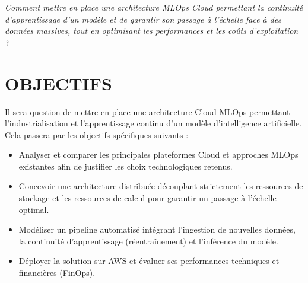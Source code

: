 \begin{tcolorbox}[colback=green!5!white, colframe=green!80!black, arc=3mm, boxrule=1mm, title=\textbf{Problématique centrale}]
\itshape Comment mettre en place une architecture MLOps Cloud permettant la continuité d'apprentissage d’un modèle et de garantir son passage à l’échelle face à des données massives, tout en optimisant les performances et les coûts d’exploitation ?
\end{tcolorbox}

\vspace{2.5mm}

\section*{OBJECTIFS}
Il sera question de mettre en place une architecture Cloud MLOps permettant l'industrialisation et l'apprentissage continu d'un modèle d'intelligence artificielle. Cela passera par les objectifs spécifiques suivants :
\vspace{2mm}
\begin{itemize}
    \item[$\bullet$] Analyser et comparer les principales plateformes Cloud et approches MLOps existantes afin de justifier les choix technologiques retenus.
    \item[$\bullet$] Concevoir une architecture distribuée découplant strictement les ressources de stockage et les ressources de calcul pour garantir un passage à l'échelle optimal.
    \item[$\bullet$] Modéliser un pipeline automatisé intégrant l'ingestion de nouvelles données, la continuité d'apprentissage (réentraînement) et l'inférence du modèle.
    \item[$\bullet$] Déployer la solution sur AWS et évaluer ses performances techniques et financières (FinOps).
\end{itemize}


